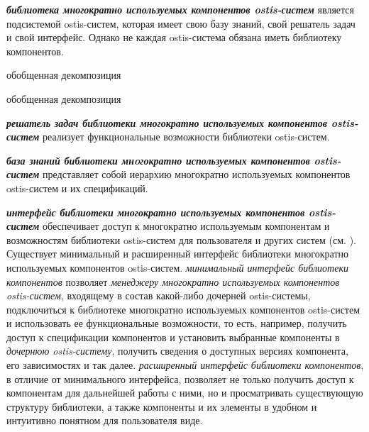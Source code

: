 \textbf{\textit{библиотека многократно используемых компонентов ostis-систем}} является подсистемой ostis-систем, которая имеет свою базу знаний, свой решатель задач и свой интерфейс. Однако не каждая ostis-система обязана иметь библиотеку компонентов.

\begin{SCn}
	\begin{scnrelfromset}{обобщенная декомпозиция}
		\begin{scnindent}
			\begin{scnrelfromset}{обобщенная декомпозиция}
				\begin{scnindent}
				\end{scnindent}
			\end{scnrelfromset}
		\end{scnindent}
	\end{scnrelfromset}
\end{SCn}

\textbf{\textit{решатель задач библиотеки многократно используемых компонентов ostis-систем}} реализует функциональные возможности библиотеки ostis-систем.

\textbf{\textit{база знаний библиотеки мнoгократно используемых компонентов ostis-систем}} представляет собой иерархию многократно используемых компонентов ostis-систем и их спецификаций.

\textbf{\textit{интерфейс библиотеки многократно используемых компонентов ostis-систем}} обеспечивает доступ к многократно используемым компонентам и возможностям библиотеки ostis-систем для пользователя и других систем (см. ). Существует минимальный и расширенный интерфейс библиотеки многократно используемых компонентов ostis-систем. \textit{минимальный интерфейс библиотеки компонентов} позволяет \textit{менеджеру многократно используемых компонентов ostis-систем}, входящему в состав какой-либо дочерней ostis-системы, подключиться к библиотеке многократно используемых компонентов ostis-систем и использовать ее функциональные возможности, то есть, например, получить доступ к спецификации компонентов и установить выбранные компоненты в \textit{дочернюю ostis-систему}, получить сведения о доступных версиях компонента, его зависимостях и так далее. \textit{расширенный интерфейс библиотеки компонентов}, в отличие от минимального интерфейса, позволяет не только получить доступ к компонентам для дальнейшей работы с ними, но и просматривать существующую структуру библиотеки, а также компоненты и их элементы в удобном и интуитивно понятном для пользователя виде.

